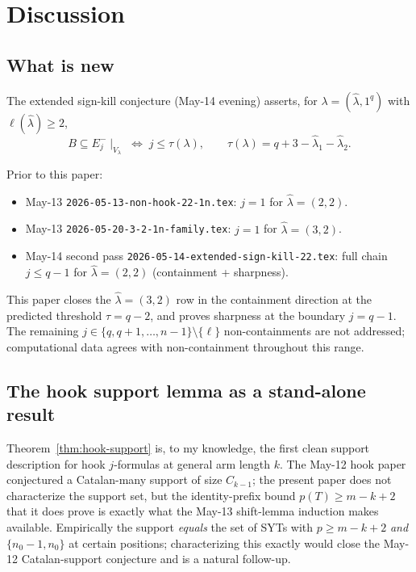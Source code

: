\documentclass[11pt]{article}
\theoremstyle{definition}
\newcommand{\hatl}{\widehat\lambda}
\begin{document}
\section{Discussion}\label{sec:discussion}

\subsection{What is new}

The extended sign-kill conjecture (May-14 evening) asserts, for
$\lambda = (\hatl, 1^q)$ with $\ell(\hatl) \ge 2$,
\[
   B \subseteq E_j^-\!\mid_{V_\lambda} \;\Longleftrightarrow\;
   j \le \tau(\lambda),
   \qquad
   \tau(\lambda) = q + 3 - \hatl_1 - \hatl_2.
\]

Prior to this paper:
\begin{itemize}[topsep=0.3em,itemsep=0.1em]
\item May-13 \texttt{2026-05-13-non-hook-22-1n.tex}: $j = 1$ for
  $\hatl = (2, 2)$.
\item May-13 \texttt{2026-05-20-3-2-1n-family.tex}: $j = 1$ for
  $\hatl = (3, 2)$.
\item May-14 second pass \texttt{2026-05-14-extended-sign-kill-22.tex}:
  full chain $j \le q - 1$ for $\hatl = (2, 2)$ (containment +
  sharpness).
\end{itemize}

This paper closes the $\hatl = (3, 2)$ row in the containment
direction at the predicted threshold $\tau = q - 2$, and proves
sharpness at the boundary $j = q - 1$.  The remaining $j \in \{q,
q + 1, \ldots, n - 1\} \setminus \{\ell\}$ non-containments are
not addressed; computational data agrees with non-containment
throughout this range.

\subsection{The hook support lemma as a stand-alone result}

Theorem~\ref{thm:hook-support} is, to my knowledge, the first clean
support description for hook $j$-formulas at general arm length
$k$.  The May-12 hook paper conjectured a Catalan-many support of
size $C_{k - 1}$; the present paper does not characterize the
support set, but the identity-prefix bound $p(T) \ge m - k + 2$ that
it does prove is exactly what the May-13 shift-lemma induction makes
available.  Empirically the support \emph{equals} the set of SYTs
with $p \ge m - k + 2$ \emph{and} $\{n_0 - 1, n_0\}$ at certain
positions; characterizing this exactly would close the May-12
Catalan-support conjecture and is a natural follow-up.
\end{document}
